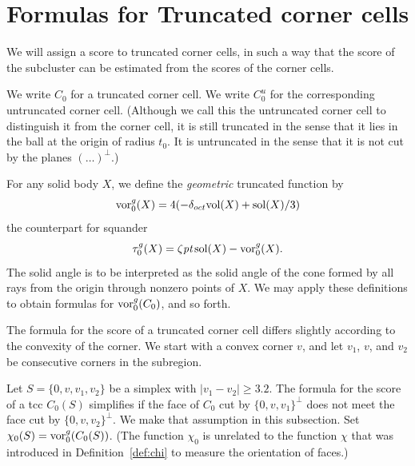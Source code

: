\section{Formulas for Truncated corner cells}

We will assign a score to truncated corner cells, in such a way that the
score of the subcluster can be estimated from the scores of the corner
cells.

We write $C_0$ for a truncated corner cell.  We write $C_0^u$ for the
corresponding untruncated corner cell.  (Although we call this the
untruncated corner cell to distinguish it from the corner cell, it is
still truncated in the sense that it lies in the ball at the origin of
radius $t_0$.  It is untruncated in the sense that it is not cut by the
planes $(\ldots)^\perp$.)

For any solid body $X$, we define the {\it geometric} truncated
function by
    $$\operatorname{vor}_0^{g}(X) = 4(-\delta_{oct} {\operatorname{vol}}(X) + \operatorname{sol}(X)/3)$$
the counterpart for squander
    $$\tau_0^g(X) = \zeta\hbox{\it pt} \operatorname{sol}(X) - \operatorname{vor}_0^g(X).$$
The solid angle is to be interpreted as the solid angle of the cone
formed by all rays from the origin through nonzero points of $X$. We may
apply these definitions to obtain formulas for $\operatorname{vor}_0^{g}(C_0)$, and so
forth.

The formula for the score of a truncated corner cell differs slightly
according to the convexity of the corner.  We start with a convex corner
$v$, and let $v_1$, $v$, and $v_2$ be consecutive corners in the
subregion.

Let $S=\{0,v,v_1,v_2\}$ be a simplex with $|v_1-v_2|\ge3.2$. The formula
for the score of a tcc $C_0(S)$ simplifies if the face of $C_0$ cut by
$\{0,v,v_1\}^\perp$ does not meet the face cut by $\{0,v,v_2\}^\perp$. We
make that assumption in this subsection. Set
    $\chi_0(S) =\operatorname{vor}^g_0(C_0(S))$.
(The function $\chi_0$ is unrelated to the function $\chi$ that was
introduced in Definition~\ref{def:chi} to measure the orientation of
faces.)

